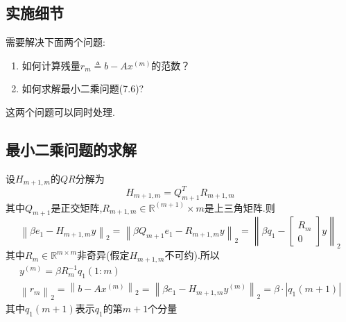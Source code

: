 \documentclass[12pt,a4paper]{article}
\begin{document}
\subsection*{实施细节}
需要解决下面两个问题:
\begin{enumerate}[(1)]
	\item 如何计算残量$r_{m} \triangleq b-A x^{(m)}$的范数？
	\item 如何求解最小二乘问题(7.6)?
\end{enumerate}
{\color{blue}这两个问题可以同时处理.}\\
\subsection*{最小二乘问题的求解}
设$H_{m+1, m}$的$QR$分解为
$$
H_{m+1, m}=Q_{m+1}^{T} R_{m+1, m}
$$
其中$Q_{m+1}$是正交矩阵,$R_{m+1, m} \in \mathbb{R}^{(m+1)} \times m$是上三角矩阵.则
$$
\left\|\beta e_{1}-H_{m+1, m} y\right\|_{2}=\left\|\beta Q_{m+1} e_{1}-R_{m+1, m} y\right\|_{2}=\left\|\beta q_{1}-\left[\begin{array}{c}{R_{m}} \\ {0}\end{array}\right] y\right\|_{2}
$$
其中$R_{m} \in \mathbb{R}^{m \times m}$非奇异(假定$H_{m+1, m}$不可约).所以
$$
\begin{array}{l}{y^{(m)}=\beta R_{m}^{-1} q_{1}(1 : m)} \\ {\left\|r_{m}\right\|_{2}=\left\|b-A x^{(m)}\right\|_{2}=\left\|\beta e_{1}-H_{m+1, m} y^{(m)}\right\|_{2}=\beta \cdot\left|q_{1}(m+1)\right|}\end{array}
$$
其中$q_{1}(m+1)$表示$q_1$的第$m+ 1$个分量
\end{document}
